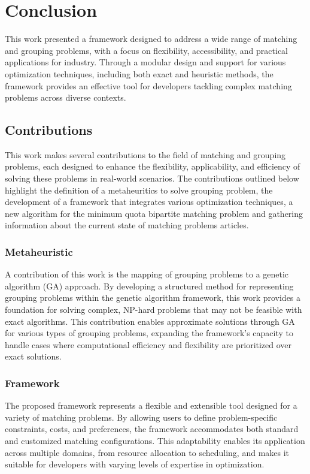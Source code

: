 \chapter{Conclusion} \label{chap:conclusion}

This work presented a framework designed to address a wide range of matching and grouping problems, with a focus on flexibility, accessibility, and practical applications for industry. Through a modular design and support for various optimization techniques, including both exact and heuristic methods, the framework provides an effective tool for developers tackling complex matching problems across diverse contexts.

\section{Contributions}
    This work makes several contributions to the field of matching and grouping problems, each designed to enhance the flexibility, applicability, and efficiency of solving these problems in real-world scenarios. The contributions outlined below highlight the definition of a metaheuritics to solve grouping problem, the development of a framework that integrates various optimization techniques, a new algorithm for the minimum quota bipartite matching problem and gathering information about the current state of matching problems articles.
    \subsection{Metaheuristic}
    A contribution of this work is the mapping of grouping problems to a genetic algorithm (GA) approach. By developing a structured method for representing grouping problems within the genetic algorithm framework, this work provides a foundation for solving complex, NP-hard problems that may not be feasible with exact algorithms. This contribution enables approximate solutions through GA for various types of grouping problems, expanding the framework's capacity to handle cases where computational efficiency and flexibility are prioritized over exact solutions.


    \subsection{Framework}
        The proposed framework represents a flexible and extensible tool designed for a variety of matching problems. By allowing users to define problem-specific constraints, costs, and preferences, the framework accommodates both standard and customized matching configurations. This adaptability enables its application across multiple domains, from resource allocation to scheduling, and makes it suitable for developers with varying levels of expertise in optimization.
    
